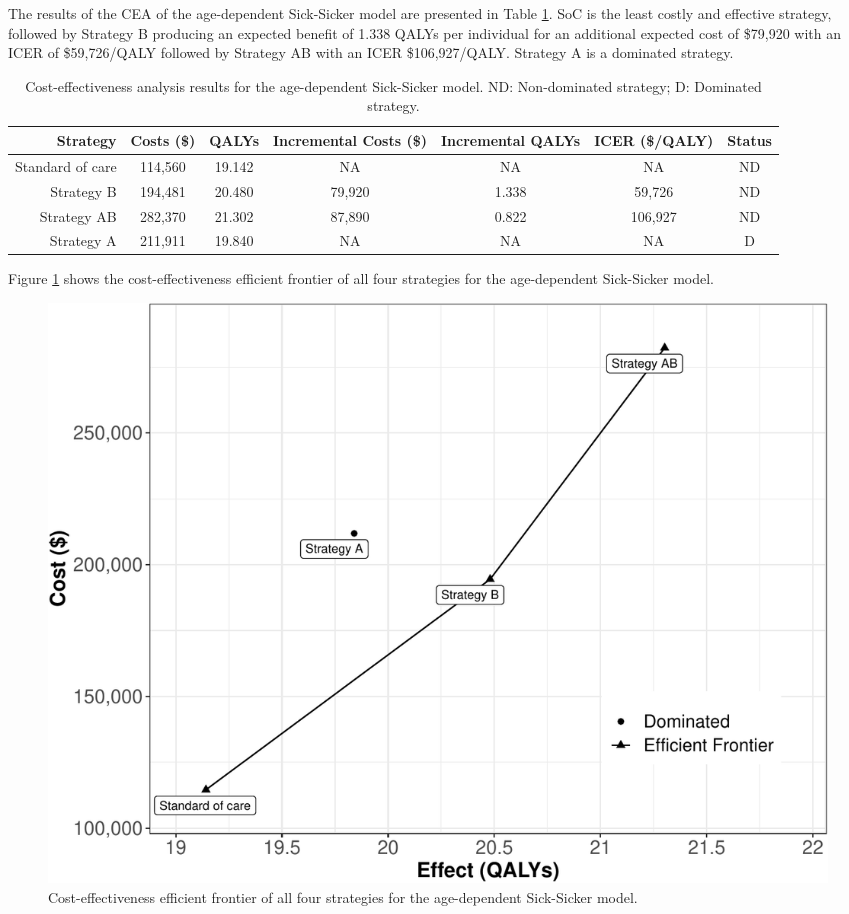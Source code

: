 \documentclass[
]{article}
\begin{document}
The results of the CEA of the age-dependent Sick-Sicker model are presented in Table \ref{tab:table-cea}. SoC is the least costly and effective strategy, followed by Strategy B producing an expected benefit of 1.338 QALYs per individual for an additional expected cost of \$79,920 with an ICER of \$59,726/QALY followed by Strategy AB with an ICER \$106,927/QALY. Strategy A is a dominated strategy.

\begin{table}[!h]

\caption{\label{tab:table-cea}Cost-effectiveness analysis results for the age-dependent Sick-Sicker model. ND: Non-dominated strategy; D: Dominated strategy.}
\centering
\begin{tabular}[t]{rcccccc}
\toprule
Strategy & Costs (\$) & QALYs & Incremental Costs (\$) & Incremental QALYs & ICER (\$/QALY) & Status\\
\midrule
Standard of care & 114,560 & 19.142 & NA & NA & NA & ND\\
Strategy B & 194,481 & 20.480 & 79,920 & 1.338 & 59,726 & ND\\
Strategy AB & 282,370 & 21.302 & 87,890 & 0.822 & 106,927 & ND\\
Strategy A & 211,911 & 19.840 & NA & NA & NA & D\\
\bottomrule
\end{tabular}
\end{table}

Figure \ref{fig:Sick-Sicker-CEA-AgeDep} shows the cost-effectiveness efficient frontier of all four strategies for the age-dependent Sick-Sicker model.

\begin{figure}[H]

{\centering \includegraphics{../figs/Sick-Sicker-CEA-AgeDep-1} 

}

\caption{Cost-effectiveness efficient frontier of all four strategies for the age-dependent Sick-Sicker model.}\label{fig:Sick-Sicker-CEA-AgeDep}
\end{figure}
\end{document}
